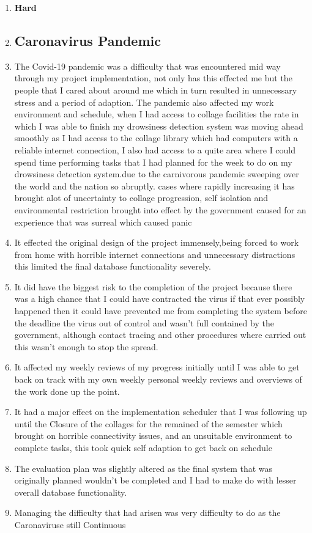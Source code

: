 \begin{enumerate}
\item \textbf{Hard}
\item \subsection{ \textbf{Caronavirus Pandemic} }																																										\item The Covid-19 pandemic was a difficulty that was encountered mid way through my project implementation, not only has this effected me but the people that I cared about around me which in turn resulted in unnecessary stress and a period of adaption. The pandemic also affected my work environment and schedule, when I had access to collage facilities the rate in which I was able to finish my drowsiness detection system was moving ahead smoothly as I had access to the collage library which had computers with a reliable internet connection, I also had access to a quite area where I could spend time performing tasks that I had planned for the week to do on my drowsiness detection system.due to the carnivorous pandemic sweeping over the world and the nation so abruptly. cases where rapidly increasing it has brought alot of uncertainty to collage progression, self isolation and environmental restriction brought into effect by the government caused for an experience that was surreal which caused panic   																																																										\item It effected the original design of the project immensely,being forced to work from home with horrible internet connections and unnecessary distractions this limited the final database functionality severely. 																																				\item It did have the biggest risk to the completion of the project because there was a high chance that I could have contracted the virus if that ever possibly happened then it could have prevented me from 	completing the system before the deadline the virus out of control and wasn't full contained by the government, although contact tracing and other procedures where carried out this wasn't enough to stop the spread.						\item It affected my weekly reviews of my progress initially until I was able to get back on track with my own weekly personal weekly reviews and overviews of the work done up the point.																																													\item It had a major effect on the implementation scheduler that I was following up until the Closure of the collages for the remained of the semester which brought on horrible connectivity issues, and an unsuitable environment to complete tasks, this took quick self adaption to get back on schedule																																																										\item The evaluation plan was slightly altered as the final system that was originally planned wouldn't be completed and I had to make do with lesser overall database functionality.																																															\item Managing the difficulty that had arisen was very difficulty to do as the Caronaviruse still  Continuous 
\end{enumerate}
